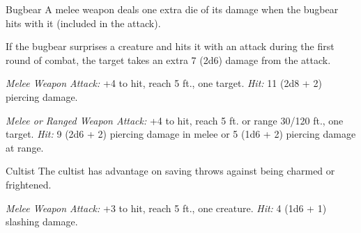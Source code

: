 \documentclass[10pt,a4paper,twoside,bg=print,twocolumn,openany,nodeprecatedcode]{dndbook}
\begin{document}
\begin{DndMonster}[float=t]{Bugbear}
\DndMonsterBasics[
armor-class = {16 (\textit{hide armor})},
hit-points = {\DndDice{5d8 + 5}},
speed = {30 ft.}
]
\DndMonsterAbilityScores[
 str = 15,
 dex = 14,
 con = 13,
 int = 8,
 wis = 11,
 cha = 9
]
\DndMonsterDetails[
skills = {Stealth +6, Survival +2},
senses = {darkvision 60 ft., passive perception 10},
languages = {Common, Goblin},
challenge = 1,
]
A melee weapon deals one extra die of its damage when the bugbear hits with it (included in the attack).

If the bugbear surprises a creature and hits it with an attack during the first round of combat, the target takes an extra 7 (2d6) damage from the attack.

\par
{}
\textsl{Melee Weapon Attack:} +4 to hit, reach 5 ft., one target. \textsl{Hit:} 11 (2d8 + 2) piercing damage.

\textsl{Melee or Ranged Weapon Attack:} +4 to hit, reach 5 ft. or range 30/120 ft., one target. \textsl{Hit:} 9 (2d6 + 2) piercing damage in melee or 5 (1d6 + 2) piercing damage at range.

\end{DndMonster}



\begin{DndMonster}[float=t]{Cultist}
\DndMonsterBasics[
armor-class = {12 (\textit{leather armor})},
hit-points = {\DndDice{2d8}},
speed = {30 ft.}
]
\DndMonsterAbilityScores[
 str = 11,
 dex = 12,
 con = 10,
 int = 10,
 wis = 11,
 cha = 10
]
\DndMonsterDetails[
skills = {Deception +2, Religion +2},
languages = {any one language (usually Common)},
challenge = 1/8,
]
The cultist has advantage on saving throws against being charmed or frightened.

\par
{}
\textsl{Melee Weapon Attack:} +3 to hit, reach 5 ft., one creature. \textsl{Hit:} 4 (1d6 + 1) slashing damage.

\end{DndMonster}
\end{document}

